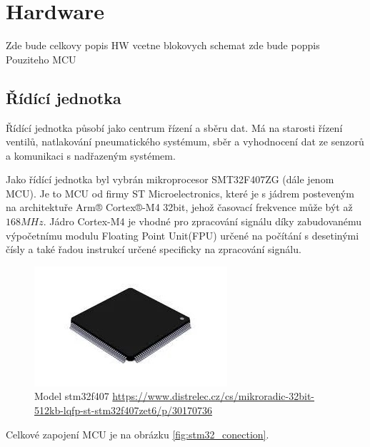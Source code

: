 \chapter{Hardware}
Zde bude celkovy popis HW vcetne blokovych schemat
zde bude poppis Pouziteho MCU


\section{Řídící jednotka}

Řídící jednotka působí jako centrum řízení a sběru dat. Má na starosti řízení ventilů, natlakování pneumatického systémum, sběr a vyhodnocení
dat ze senzorů a komunikaci s nadřazeným systémem. \par



Jako řídící jednotka byl vybrán mikroprocesor SMT32F407ZG (dále jenom MCU). Je to MCU od firmy ST Microelectronics, které je 
s jádrem posteveným na architektuře Arm® Cortex®-M4 32bit, jehož časovací frekvence může být až $168 MHz$. Jádro Cortex-M4 je vhodné pro zpracování signálu díky zabudovanému výpočetnímu modulu Floating Point Unit(FPU) určené na 
počítání s desetinými čísly a také řadou instrukcí určené specificky na zpracování signálu.

\begin{figure}[H]
    \centering
    \includegraphics{pictures/stm32f407.jpg}
    \caption{Model stm32f407 \url{https://www.distrelec.cz/cs/mikroradic-32bit-512kb-lqfp-st-stm32f407zet6/p/30170736}}
    \label{fig:stm32}
\end{figure}


Celkové zapojení MCU je na obrázku \ref{fig:stm32_conection}.

